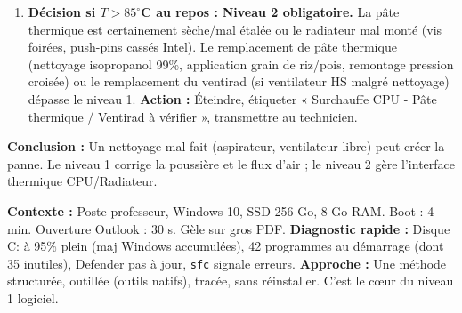 \documentclass[11pt]{article}
\newcounter{popsec}
\newcounter{popsub}
\newcommand{\courssub}[1]{%
  \stepcounter{popsub}%
  \par\vspace{9pt}\noindent{\popxbold\fontsize{11.5}{13}\selectfont\color{popink}{\color{poporange}\thepopsec.\thepopsub}\hspace{6pt}#1}\par\nopagebreak\vspace{4pt}
}
\begin{document}
\begin{exoresolu}
\begin{enumerate}
\begin{enumerate}
              \item Ouvrir boîtier. \textbf{Inspecter visuellement} : Radiateur CPU bien plaqué ? Vis serrées en croix (diagonales) ? Pâte visible qui déborde légèrement (bon signe) ou sec/craquelé (mauvais) ?
              \item \textbf{Nettoyer correctement ventilateurs/radiateurs :} Bombe air comprimé verticale, \textbf{pales bloquées}. Souffler dans le sens inverse du flux d'air habituel (arrière $\rightarrow$ avant) pour sortir poussière. Nettoyer grilles boîtier.
              \item \textbf{Vérifier flux d'air :} Câbles rangés (colliers) $\rightarrow$ pas d'obstruction entrée (avant) / sortie (arrière/haut). Ventilateurs boîtier : Entrée avant/bas, Sortie arrière/haut.
              \item \textbf{BIOS/UEFI :} Vérifier courbe ventilateur CPU (Mode « Performance » ou « Turbo » / Courbe personnalisée : 50\% $\rightarrow$ 50°C, 100\% $\rightarrow$ 70°C). Désactiver mode « Silencieux ».
              \item \textbf{Test :} Refermer, démarrer. Surveiller température (HWMonitor / Gestionnaire des tâches Onglet Performance) 15 min charge (bench CPU simple).
          \end{enumerate}
    \item \textbf{Décision si $T > 85^\circ$C au repos :} \textbf{Niveau 2 obligatoire.} La pâte thermique est certainement sèche/mal étalée ou le radiateur mal monté (vis foirées, push-pins cassés Intel). Le remplacement de pâte thermique (nettoyage isopropanol 99\%, application grain de riz/pois, remontage pression croisée) ou le remplacement du ventirad (si ventilateur HS malgré nettoyage) dépasse le niveau 1. \textbf{Action :} Éteindre, étiqueter « Surchauffe CPU - Pâte thermique / Ventirad à vérifier », transmettre au technicien.
\end{enumerate}
\textbf{Conclusion :} Un nettoyage mal fait (aspirateur, ventilateur libre) peut créer la panne. Le niveau 1 corrige la poussière et le flux d'air ; le niveau 2 gère l'interface thermique CPU/Radiateur.
\end{exoresolu}

\courssub{Maintenance logicielle de premier niveau}

\begin{experience}
    \textbf{Contexte :} Poste professeur, Windows 10, SSD 256 Go, 8 Go RAM. Boot : 4 min. Ouverture Outlook : 30 s. Gèle sur gros PDF.
    \textbf{Diagnostic rapide :} Disque C: à 95\% plein (maj Windows accumulées), 42 programmes au démarrage (dont 35 inutiles), Defender pas à jour, \texttt{sfc} signale erreurs.
    \textbf{Approche :} Une méthode structurée, outillée (outils natifs), tracée, sans réinstaller. C'est le cœur du niveau 1 logiciel.
\end{experience}
\end{document}
